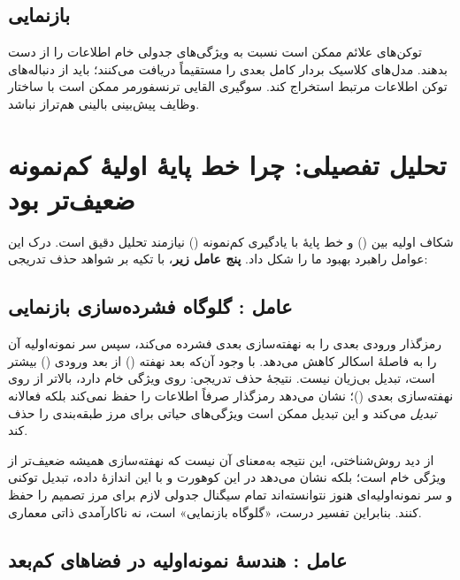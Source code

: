 \subsection{بازنمایی}

توکن‌های علائم ممکن است نسبت به ویژگی‌های جدولی خام اطلاعات را از دست بدهند. مدل‌های کلاسیک بردار کامل بعدی را مستقیماً دریافت می‌کنند؛  باید از دنباله‌های توکن اطلاعات مرتبط استخراج کند. سوگیری القایی ترنسفورمر ممکن است با ساختار وظایف پیش‌بینی بالینی هم‌تراز نباشد.

\section{تحلیل تفصیلی: چرا خط پایۀ اولیۀ کم‌نمونه ضعیف‌تر بود}

شکاف اولیه   بین  () و خط پایۀ  با یادگیری کم‌نمونه () نیازمند تحلیل دقیق است. درک این عوامل راهبرد بهبود ما را شکل داد. \textbf{پنج عامل زیر}، با تکیه بر شواهد حذف تدریجی:

\subsection{عامل : گلوگاه فشرده‌سازی بازنمایی}

رمزگذار  ورودی بعدی را به نهفته‌سازی بعدی فشرده می‌کند، سپس سر نمونه‌اولیه آن را به فاصلۀ اسکالر کاهش می‌دهد. با وجود آن‌که بعد نهفته () از بعد ورودی () بیشتر است، تبدیل بی‌زیان نیست. نتیجۀ حذف تدریجی:  روی  ویژگی خام   دارد، بالاتر از  روی نهفته‌سازی بعدی ()؛ نشان می‌دهد رمزگذار  صرفاً اطلاعات را حفظ نمی‌کند بلکه فعالانه \emph{تبدیل} می‌کند و این تبدیل ممکن است ویژگی‌های حیاتی برای مرز طبقه‌بندی را حذف کند.

از دید روش‌شناختی، این نتیجه به‌معنای آن نیست که نهفته‌سازی  همیشه ضعیف‌تر از ویژگی خام است؛ بلکه نشان می‌دهد در این کوهورت و با این اندازۀ داده، تبدیل توکنی و سر نمونه‌اولیه‌ای هنوز نتوانسته‌اند تمام سیگنال جدولی لازم برای مرز تصمیم را حفظ کنند. بنابراین تفسیر درست، «گلوگاه بازنمایی» است، نه ناکارآمدی ذاتی معماری.

\subsection{عامل : هندسۀ نمونه‌اولیه در فضاهای کم‌بعد}

